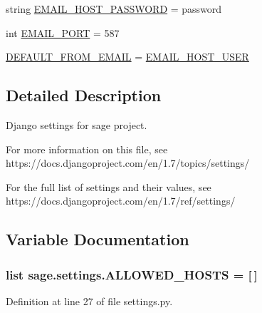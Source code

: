 \begin{DoxyCompactItemize}
\item 
string \hyperlink{namespacesage_1_1settings_a66e7a16ed6b0df5716a6579fcba949a6}{E\+M\+A\+I\+L\+\_\+\+H\+O\+S\+T\+\_\+\+P\+A\+S\+S\+W\+O\+R\+D} = \textquotesingle{}password\textquotesingle{}
\item 
int \hyperlink{namespacesage_1_1settings_a3fe927460bba6408b5df39fa8a10d367}{E\+M\+A\+I\+L\+\_\+\+P\+O\+R\+T} = 587
\item 
\hyperlink{namespacesage_1_1settings_a6517c4f93850d63e2bdbe7040ad0e2ff}{D\+E\+F\+A\+U\+L\+T\+\_\+\+F\+R\+O\+M\+\_\+\+E\+M\+A\+I\+L} = \hyperlink{namespacesage_1_1settings_a9c01855359753a3c3f517341806347c2}{E\+M\+A\+I\+L\+\_\+\+H\+O\+S\+T\+\_\+\+U\+S\+E\+R}
\end{DoxyCompactItemize}


\subsection{Detailed Description}
\begin{DoxyVerb}Django settings for sage project.

For more information on this file, see
https://docs.djangoproject.com/en/1.7/topics/settings/

For the full list of settings and their values, see
https://docs.djangoproject.com/en/1.7/ref/settings/
\end{DoxyVerb}
 

\subsection{Variable Documentation}
\hypertarget{namespacesage_1_1settings_a2eb98def792cf73bbc5884024afc5602}{}
\subsubsection[{A\+L\+L\+O\+W\+E\+D\+\_\+\+H\+O\+S\+T\+S}]{\setlength{\rightskip}{0pt plus 5cm}list sage.\+settings.\+A\+L\+L\+O\+W\+E\+D\+\_\+\+H\+O\+S\+T\+S = \mbox{[}$\,$\mbox{]}}\label{namespacesage_1_1settings_a2eb98def792cf73bbc5884024afc5602}


Definition at line 27 of file settings.\+py.

\hypertarget{namespacesage_1_1settings_add6d83672b1137d74a06bf1606aecf04}{}
